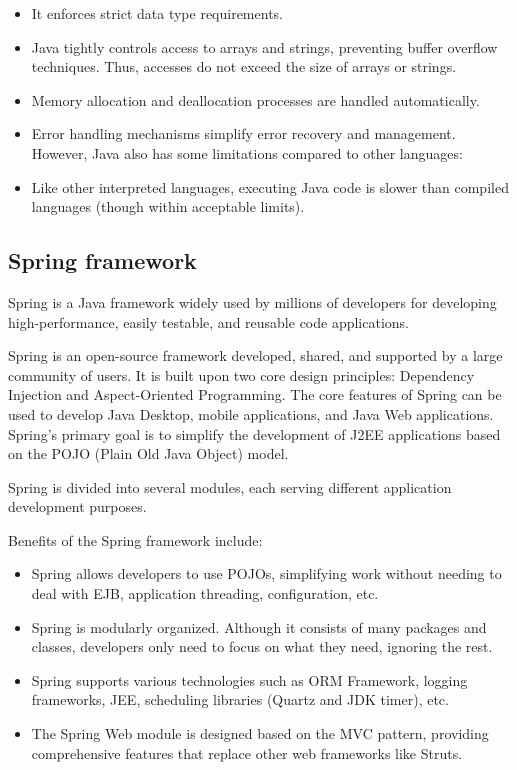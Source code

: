 \documentclass[../Main.tex]{subfiles}
\begin{document}
\begin{itemize}
    \item It enforces strict data type requirements.
    \item Java tightly controls access to arrays and strings, preventing buffer overflow techniques.
          Thus, accesses do not exceed the size of arrays or strings.
    \item Memory allocation and deallocation processes are handled automatically.
    \item Error handling mechanisms simplify error recovery and management.
          However, Java also has some limitations compared to other languages:
    \item Like other interpreted languages, executing Java code is slower than compiled languages (though within acceptable limits).
\end{itemize}

\subsection{Spring framework}

Spring is a Java framework widely used by millions of developers for developing high-performance, easily testable, and reusable code applications.

Spring is an open-source framework developed, shared, and supported by a large community of users.
It is built upon two core design principles: Dependency Injection and Aspect-Oriented Programming.
The core features of Spring can be used to develop Java Desktop, mobile applications, and Java Web applications.
Spring's primary goal is to simplify the development of J2EE applications based on the POJO (Plain Old Java Object) model.

Spring is divided into several modules, each serving different application development purposes.

Benefits of the Spring framework include:

\begin{itemize}
    \item Spring allows developers to use POJOs, simplifying work without needing to deal with EJB, application threading, configuration, etc.
    \item Spring is modularly organized.
          Although it consists of many packages and classes, developers only need to focus on what they need, ignoring the rest.
    \item Spring supports various technologies such as ORM Framework, logging frameworks, JEE, scheduling libraries (Quartz and JDK timer), etc.
    \item The Spring Web module is designed based on the MVC pattern, providing comprehensive features that replace other web frameworks like Struts.
\end{itemize}
\end{document}
